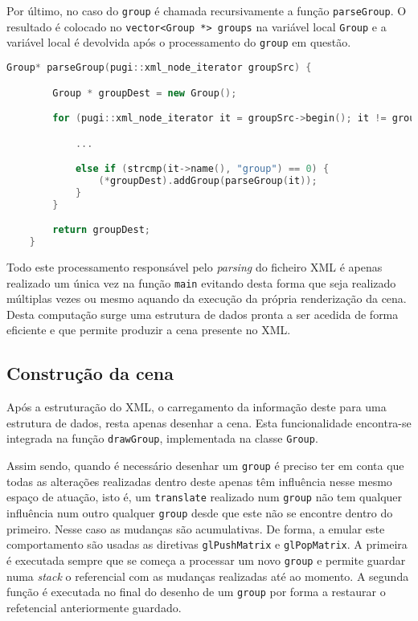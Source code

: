 \documentclass[a4paper]{article}
\begin{document}
Por último, no caso do \texttt{group} é chamada recursivamente a função \texttt{parseGroup}. O resultado é colocado no \texttt{vector<Group *> groups} na variável local \texttt{Group} e a variável local é devolvida após o processamento do \texttt{group} em questão.

\begin{lstlisting}[language=C++, caption=\textit{Parse} do nodo \texttt{group} e consequente carregamento para a estrutura de dados.]
    Group* parseGroup(pugi::xml_node_iterator groupSrc) {

        Group * groupDest = new Group();

        for (pugi::xml_node_iterator it = groupSrc->begin(); it != groupSrc->end(); ++it) {

            ...

            else if (strcmp(it->name(), "group") == 0) {
                (*groupDest).addGroup(parseGroup(it));
            }
        }

        return groupDest;
    }
\end{lstlisting}

Todo este processamento responsável pelo \textit{parsing} do ficheiro XML é apenas realizado um única vez na função \texttt{main} evitando desta forma que seja realizado múltiplas vezes ou mesmo aquando da execução da própria renderização da cena. Desta computação surge uma estrutura de dados pronta a ser acedida de forma eficiente e que permite produzir a cena presente no XML.




\subsection{Construção da cena} %

\hspace{3mm} Após a estruturação do XML, o carregamento da informação deste para uma estrutura de dados, resta apenas desenhar a cena. Esta funcionalidade encontra-se integrada na função \texttt{drawGroup}, implementada na classe \texttt{Group}.

Assim sendo, quando é necessário desenhar um \texttt{group} é preciso ter em conta que todas as alterações realizadas dentro deste apenas têm influência nesse mesmo espaço de atuação, isto é, um \texttt{translate} realizado num \texttt{group} não tem qualquer influência num outro qualquer \texttt{group} desde que este não se encontre dentro do primeiro. Nesse caso as mudanças são acumulativas. De forma, a emular este comportamento são usadas as diretivas \texttt{glPushMatrix} e \texttt{glPopMatrix}. A primeira é executada sempre que se começa a processar um novo \texttt{group} e permite guardar numa \textit{stack} o referencial com as mudanças realizadas até ao momento. A segunda função é executada no final do desenho de um \texttt{group} por forma a restaurar o refetencial anteriormente guardado.
\end{document}
